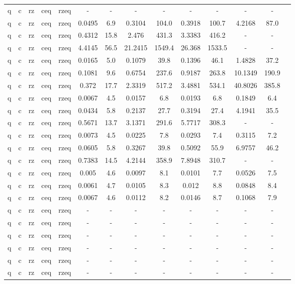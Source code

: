 \begin{table}[htb]
{\begin{tabular}{|c|c|c|c|c|c|c|c|c|c|c|c|c|c|}
q & c & rz & ceq & rzeq & - & - & - & - & - & - & - & - \\ 
q & c & rz & ceq & rzeq & 0.0495 & 6.9 & 0.3104 & 104.0 & 0.3918 & 100.7 & 4.2168 & 87.0 \\ 
q & c & rz & ceq & rzeq & 0.4312 & 15.8 & 2.476 & 431.3 & 3.3383 & 416.2 & - & - \\ 
q & c & rz & ceq & rzeq & 4.4145 & 56.5 & 21.2415 & 1549.4 & 26.368 & 1533.5 & - & - \\ 
q & c & rz & ceq & rzeq & 0.0165 & 5.0 & 0.1079 & 39.8 & 0.1396 & 46.1 & 1.4828 & 37.2 \\ 
q & c & rz & ceq & rzeq & 0.1081 & 9.6 & 0.6754 & 237.6 & 0.9187 & 263.8 & 10.1349 & 190.9 \\ 
q & c & rz & ceq & rzeq & 0.372 & 17.7 & 2.3319 & 517.2 & 3.4881 & 534.1 & 40.8026 & 385.8 \\ 
q & c & rz & ceq & rzeq & 0.0067 & 4.5 & 0.0157 & 6.8 & 0.0193 & 6.8 & 0.1849 & 6.4 \\ 
q & c & rz & ceq & rzeq & 0.0434 & 5.8 & 0.2137 & 27.7 & 0.3194 & 27.4 & 4.1941 & 35.5 \\ 
q & c & rz & ceq & rzeq & 0.5671 & 13.7 & 3.1371 & 291.6 & 5.7717 & 308.3 & - & - \\ 
q & c & rz & ceq & rzeq & 0.0073 & 4.5 & 0.0225 & 7.8 & 0.0293 & 7.4 & 0.3115 & 7.2 \\ 
q & c & rz & ceq & rzeq & 0.0605 & 5.8 & 0.3267 & 39.8 & 0.5092 & 55.9 & 6.9757 & 46.2 \\ 
q & c & rz & ceq & rzeq & 0.7383 & 14.5 & 4.2144 & 358.9 & 7.8948 & 310.7 & - & - \\ 
q & c & rz & ceq & rzeq & 0.005 & 4.6 & 0.0097 & 8.1 & 0.0101 & 7.7 & 0.0526 & 7.5 \\ 
q & c & rz & ceq & rzeq & 0.0061 & 4.7 & 0.0105 & 8.3 & 0.012 & 8.8 & 0.0848 & 8.4 \\ 
q & c & rz & ceq & rzeq & 0.0067 & 4.6 & 0.0112 & 8.2 & 0.0146 & 8.7 & 0.1068 & 7.9 \\ 
q & c & rz & ceq & rzeq & - & - & - & - & - & - & - & - \\ 
q & c & rz & ceq & rzeq & - & - & - & - & - & - & - & - \\ 
q & c & rz & ceq & rzeq & - & - & - & - & - & - & - & - \\ 
q & c & rz & ceq & rzeq & - & - & - & - & - & - & - & - \\ 
q & c & rz & ceq & rzeq & - & - & - & - & - & - & - & - \\ 
q & c & rz & ceq & rzeq & - & - & - & - & - & - & - & - \\ 

\end{tabular}}
\end{table}
